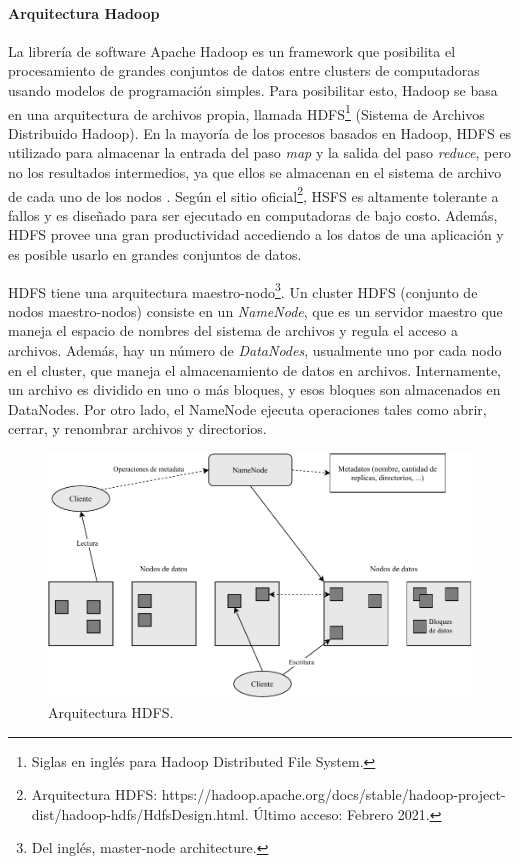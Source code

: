 \paragraph{Arquitectura Hadoop}
La librería de software Apache Hadoop es un framework que posibilita el procesamiento de grandes conjuntos de datos entre clusters de computadoras usando modelos de programación simples. Para posibilitar esto, Hadoop se basa en una arquitectura de archivos propia, llamada HDFS\footnote{Siglas en inglés para Hadoop Distributed File System.} (Sistema de Archivos Distribuido Hadoop). En la mayoría de los procesos basados en Hadoop, HDFS es utilizado para almacenar la entrada del paso \textit{map} y la salida del paso \textit{reduce}, pero no los resultados intermedios, ya que ellos se almacenan en el sistema de archivo de cada uno de los nodos \citep{condie2010mapreduce}. Según el sitio oficial\footnote{Arquitectura HDFS: https://hadoop.apache.org/docs/stable/hadoop-project-dist/hadoop-hdfs/HdfsDesign.html. Último acceso: Febrero 2021.}, HSFS es altamente tolerante a fallos y es diseñado para ser ejecutado en computadoras de bajo costo. Además, HDFS provee una gran productividad accediendo a los datos de una aplicación y es posible usarlo en grandes conjuntos de datos.

\bigskip HDFS tiene una arquitectura maestro-nodo\footnote{Del inglés, master-node architecture.}. Un cluster HDFS (conjunto de nodos maestro-nodos) consiste en un \textit{NameNode}, que es un servidor maestro que maneja el espacio de nombres del sistema de archivos y regula el acceso a archivos. Además, hay un número de \textit{DataNodes}, usualmente uno por cada nodo en el cluster, que maneja el almacenamiento de datos en archivos. Internamente, un archivo es dividido en uno o más bloques, y esos bloques son almacenados en DataNodes. Por otro lado, el NameNode ejecuta operaciones tales como abrir, cerrar, y renombrar archivos y directorios.

\begin{figure}
	\centering
	\includegraphics[width=0.9\linewidth]{7_marco_teorico/imagenes/arquitectura_hdfs}
	\caption{Arquitectura HDFS.}
	\label{fig:arquitectura_hdfs}
\end{figure}

